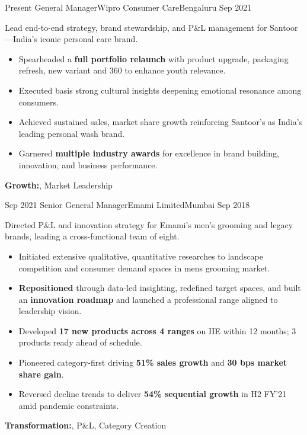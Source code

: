 \begin{experiences}

  \experience
    {Present}   {General Manager}{Wipro Consumer Care}{Bengaluru}
    {Sep 2021} {
Lead end-to-end strategy, brand stewardship, and P\&L management for Santoor—India’s iconic personal care brand.
                      \begin{itemize}
        \item {Spearheaded a \textbf{full portfolio relaunch} with product upgrade, packaging refresh, new variant and 360 to enhance youth relevance.}
        \item {Executed {} basis strong cultural insights deepening emotional resonance among consumers.}
        \item {Achieved sustained sales, market share growth reinforcing Santoor’s as India’s leading personal wash brand.}
        \item {Garnered \textbf{multiple industry awards} for excellence in brand building, innovation, and business performance.}
                      \end{itemize}
                  }
        {\textbf{Growth:}, Market Leadership} 
  \emptySeparator

  \experience
    {Sep 2021}   {Senior General Manager}{Emami Limited}{Mumbai}
    {Sep 2018} {
Directed P\&L and innovation strategy for Emami’s men’s grooming and legacy brands, leading a cross-functional team of eight.
                      \begin{itemize}
        \item {Initiated extensive qualitative, quantitative researches to landscape competition and consumer demand spaces in mens grooming market.}
        \item {\textbf{Repositioned} {} through data-led insighting, redefined target spaces, and built an \textbf{innovation roadmap} and launched a professional range aligned to leadership vision. }
        \item {Developed  \textbf{17 new products across 4 ranges} on HE within 12 months; 3 products ready ahead of schedule.}
        \item {Pioneered category-first {} driving \textbf{51\% sales growth} and \textbf{30 bps market share gain}.}
        \item {Reversed decline trends to deliver \textbf{54\% sequential growth} in H2 FY’21 amid pandemic constraints.}
                      \end{itemize}
                  }
        {\textbf{Transformation:}, P\&L, Category Creation} 
  \emptySeparator


\end{experiences}
